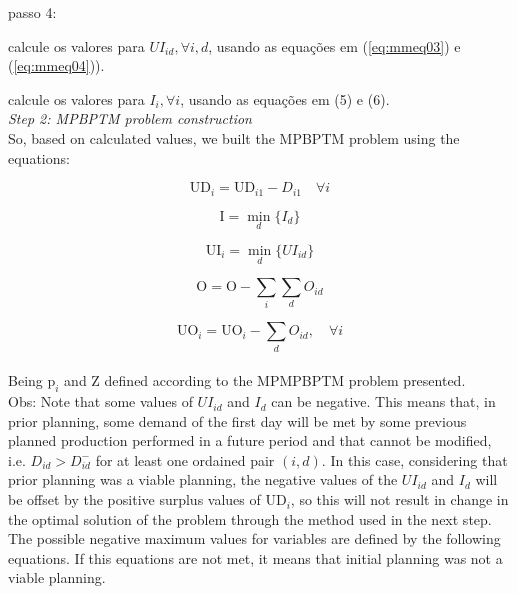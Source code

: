 \documentclass[authoryear,preprint,12pt]{elsarticle}
\begin{document}
passo 4: 

calcule os valores para $UI_{id}, \forall i, d$, usando as equações em (\ref{eq:mmeq03}) e (\ref{eq:mmeq04})).

calcule os valores para $I_{i}, \forall i$, usando as equações em (5) e (6). \\

\emph{Step 2: MPBPTM problem construction} \\
 

So, based on calculated values, we built the MPBPTM problem using the equations:

\begin{equation}
\textrm{UD}_{i} = \textrm{UD}_{i1} - D_{i1} \quad \forall i
\end{equation}

\begin{equation}
\textrm{I} = \min_{d} \{I_{d}\}
\end{equation}

\begin{equation}
	\textrm{UI}_{i} = \min_d\{UI_{id}\}
\end{equation}

\begin{equation}
\textrm{O} = \textrm{O} - \sum_{i}{\sum_{d}{O_{id}}}
\end{equation}

\begin{equation}
\textrm{UO}_{i} = \textrm{UO}_{i} - \sum_{d}{O_{id}}, \quad \forall i
\end{equation} \\

Being $\textrm{p}_{i}$ and $\textrm{Z}$ defined according to the MPMPBPTM problem presented. \\

Obs: Note that some values of $UI_{id}$ and  $I_{d}$ can be negative. This means that, in prior planning, some demand of the first day will be met by some previous planned production performed in a future period and that cannot be modified, i.e. $D_{id} > D_{id}^-$ for at least one ordained pair $(i,d)$. In this case, considering that prior planning was a viable planning, the negative values of the $UI_{id}$ and $I_{d}$ will be offset by the positive surplus values of $\textrm{UD}_{i}$, so this will not result in change in the optimal solution of the problem through the method used in the next step. \\

The possible negative maximum values for variables are defined by the following equations. If this equations are not met, it means that initial planning was not a viable planning.
\end{document}
